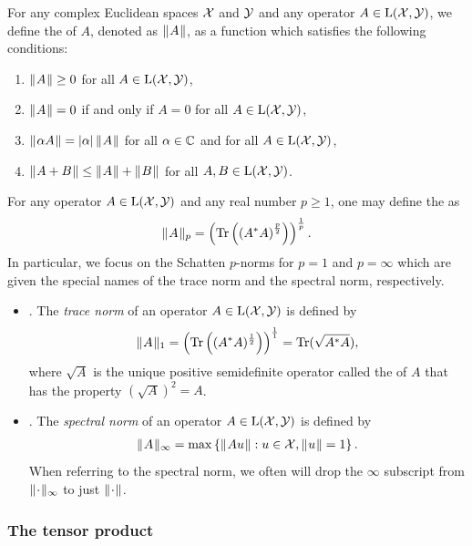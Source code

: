 For any complex Euclidean spaces $\mathcal{X}$ and $\mathcal{Y}$ and any operator $A \in \mathrm{L}(\mathcal{X},\mathcal{Y})$, we define the  of $A$, denoted as $\lVert\mspace{1mu} A \mspace{1mu}\rVert$, as a function which satisfies the following conditions:
\begin{enumerate}
	\item $\lVert\mspace{1mu} A \mspace{1mu}\rVert \geq 0$ for all $A \in \mathrm{L}(\mathcal{X},\mathcal{Y})$,
	\item $\lVert\mspace{1mu} A \mspace{1mu}\rVert = 0$ if and only if $A = 0$ for all $A \in \mathrm{L}(\mathcal{X},\mathcal{Y})$,
	\item $\lVert\mspace{1mu} \alpha A \mspace{1mu}\rVert = \left\lvert \alpha \right\rvert\lVert\mspace{1mu} A \mspace{1mu}\rVert$ for all $\alpha \in \mathbb{C}$ and for all $A \in \mathrm{L}(\mathcal{X},\mathcal{Y})$,
	\item $\lVert\mspace{1mu} A + B \mspace{1mu}\rVert \leq \lVert\mspace{1mu} A \mspace{1mu}\rVert + \lVert\mspace{1mu} B \mspace{1mu}\rVert$ for all $A,B \in \mathrm{L}(\mathcal{X},\mathcal{Y})$. 
\end{enumerate}
 For any operator $A \in \mathrm{L}(\mathcal{X},\mathcal{Y})$ and any real number $p \geq 1$, one may define the  as
\begin{align}
	\lVert\mspace{1mu} A \mspace{1mu}\rVert_p = \left( \operatorname{Tr} \left( \left( A^* A \right)^{\frac{p}{2}} \right) \right)^{\frac{1}{p}}.
\end{align}
In particular, we focus on the Schatten $p$-norms for $p = 1$ and $p = \infty$ which are given the special names of the trace norm and the spectral norm, respectively.
\begin{itemize}
	\item {}. The \emph{trace norm} of an operator $A \in \mathrm{L}(\mathcal{X},\mathcal{Y})$ is defined by
\begin{align}
	\lVert\mspace{1mu} A \mspace{1mu}\rVert_1 = \left( \operatorname{Tr}\left( (A^* A)^{\frac{1}{2}} \right) \right)^{\frac{1}{1}} = \operatorname{Tr}(\sqrt{A^*A}),
\end{align}
where $\sqrt{A}$ is the unique positive semidefinite operator called the  of $A$ that has the property $\left(\sqrt{A} \right)^2 = A$. 
	\item {}. The \emph{spectral norm} of an operator $A \in \mathrm{L}(\mathcal{X},\mathcal{Y})$ is defined by
	\begin{align}
		\lVert\mspace{1mu} A \mspace{1mu}\rVert_{\infty} = \max \left \{ \lVert\mspace{1mu} Au \mspace{1mu}\rVert : u \in \mathcal{X}, \lVert\mspace{1mu} u \mspace{1mu}\rVert = 1 \right \}.
	\end{align}
	When referring to the spectral norm, we often will drop the $\infty$ subscript from $\lVert\mspace{1mu} \cdot \mspace{1mu}\rVert_{\infty}$ to just $\lVert\mspace{1mu} \cdot \mspace{1mu}\rVert$. 
\end{itemize}

\subsubsection*{The tensor product}

